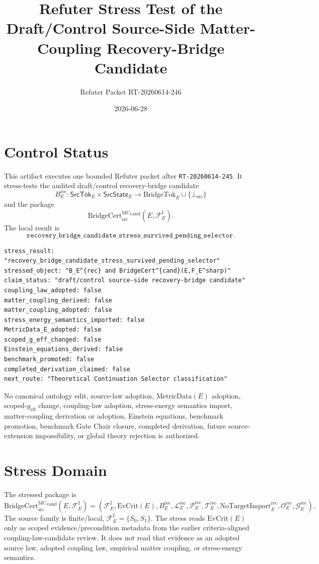 \documentclass[11pt]{article}
\title{Refuter Stress Test of the Draft/Control Source-Side Matter-Coupling Recovery-Bridge Candidate}
\author{Refuter Packet RT-20260614-246}
\date{2026-06-28}
\newcommand{\geff}{g_{\mathrm{eff}}}
\newcommand{\MetricData}{\mathrm{MetricData}}
\newcommand{\BridgeCert}{\mathrm{BridgeCert}_{\mathrm{src}}^{\mathrm{MC}}}
\newcommand{\EvCrit}{\mathrm{EvCrit}}
\newcommand{\BottomSrc}{\bot_{\mathrm{src}}}
\newcommand{\BridgeTok}{\mathrm{BridgeTok}}
\newcommand{\NoTargetImport}{\mathrm{NoTargetImport}}
\newcommand{\BErec}{B_E^{\mathrm{rec}}}
\begin{document}
\maketitle

\section{Control Status}

This artifact executes one bounded Refuter packet after \texttt{RT-20260614-245}.
It stress-tests the audited draft/control recovery-bridge candidate
\[
  \BErec:\mathsf{SrcTok}_E\times\mathsf{SrcState}_E
  \longrightarrow \BridgeTok_E\cup\{\BottomSrc\}
\]
and the package
\[
  \BridgeCert^{\mathrm{cand}}(E,\mathcal{F}_E^\sharp).
\]
The local result is
\[
  \texttt{recovery\_bridge\_candidate\_stress\_survived\_pending\_selector}.
\]

\begin{verbatim}
stress_result: "recovery_bridge_candidate_stress_survived_pending_selector"
stressed_object: "B_E^{rec} and BridgeCert^{cand}(E,F_E^sharp)"
claim_status: "draft/control source-side recovery-bridge candidate"
coupling_law_adopted: false
matter_coupling_derived: false
matter_coupling_adopted: false
stress_energy_semantics_imported: false
MetricData_E_adopted: false
scoped_g_eff_changed: false
Einstein_equations_derived: false
benchmark_promoted: false
completed_derivation_claimed: false
next_route: "Theoretical Continuation Selector classification"
\end{verbatim}

No canonical ontology edit, source-law adoption, \(\MetricData(E)\)
adoption, scoped-\(\geff\) change, coupling-law adoption, stress-energy
semantics import, matter-coupling derivation or adoption, Einstein equations,
benchmark promotion, benchmark Gate Chair closure, completed derivation,
future source-extension impossibility, or global theory rejection is
authorized.

\section{Stress Domain}

The stressed package is
\[
  \BridgeCert^{\mathrm{cand}}(E,\mathcal{F}_E^\sharp)
  =
  (\mathcal{F}_E^\sharp,\EvCrit(E),\BErec,
  \mathcal{L}_E^{\mathrm{rec}},\mathcal{P}_E^{\mathrm{rec}},
  \mathcal{T}_E^{\mathrm{rec}},\NoTargetImport_E^{\mathrm{rec}},
  \mathcal{O}_E^{\mathrm{rec}},\mathcal{G}_E^{\mathrm{rec}}).
\]
The source family is finite/local, \(\mathcal{F}_E^\sharp=\{S_0,S_1\}\).
The stress reads \(\EvCrit(E)\) only as scoped evidence/precondition metadata
from the earlier criteria-aligned coupling-law-candidate review. It does not
read that evidence as an adopted source law, adopted coupling law, empirical
matter coupling, or stress-energy semantics.
\end{document}
